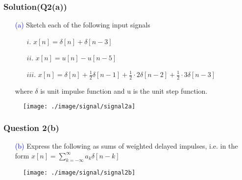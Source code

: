 \documentclass{beamer}
\newcommand{\blue}[1]{\textcolor{blue}{#1}}
\begin{document}

\begin{frame}
\frametitle{Solution(Q2(a))}

\begin{itemize} \itemsep6pt \parskip0pt 
  \item[\blue{(a)}] Sketch each of the following input signals
  \begin{itemize} \itemsep1pt \parskip0pt 
    \item[$i.$] $x[n] = \delta[n] + \delta[n-3]$
    \item[$ii.$] $x[n] = u[n] - u[n-5]$
    \item[$iii.$] $x[n] = \delta[n] + \frac{1}{2}\delta[n-1] + \frac{1}{2} \cdot 2\delta[n-2] + \frac{1}{2}\cdot 3\delta[n-3]$
  \end{itemize}
  where $\delta$ is unit impulse function and u is the unit step function.
\end{itemize}
\begin{figure}[H]
  \centering
  \texttt{[image: ./image/signal/signal2a]}
\end{figure}

\end{frame}


\begin{frame}
\frametitle{Question 2(b)}

\begin{itemize} \itemsep6pt \parskip0pt 
  \item[\blue{(b)}] Express the following as sums of weighted delayed impulses, \newline i.e. in the form $x[n] = \sum_{k = -\infty}^{\infty}a_k\delta[n-k]$
\end{itemize}
\begin{figure}[H]
  \centering
  \texttt{[image: ./image/signal/signal2b]}
\end{figure}
\end{frame}

\end{document}
